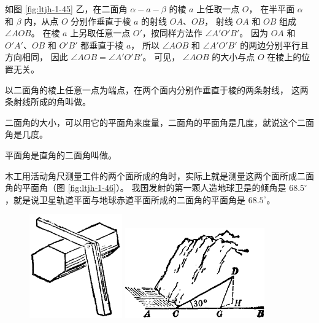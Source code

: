 如图 \ref{fig:ltjh-1-45} 乙，在二面角 $\alpha{-}a{-}\beta$ 的棱 $a$ 上任取一点 $O$，
在半平面 $\alpha$ 和 $\beta$ 内，从点 $O$ 分别作垂直于棱 $a$ 的射线 $OA$、$OB$，
射线 $OA$ 和 $OB$ 组成 $\angle AOB$。
在棱 $a$ 上另取任意一点 $O'$，按同样方法作 $\angle A'O'B'$。
因为 $OA$ 和 $O'A'$、$OB$ 和 $O'B'$ 都垂直于棱 $a$，
所以 $\angle AOB$ 和 $\angle A'O'B'$ 的两边分别平行且方向相同，
因此 $\angle AOB = \angle A'O'B'$。
可见， $\angle AOB$ 的大小与点 $O$ 在棱上的位置无关。

以二面角的棱上任意一点为端点，在两个面内分别作垂直于棱的两条射线，
这两条射线所成的角叫做。

二面角的大小，可以用它的平面角来度量，二面角的平面角是几度，就说这个二面角是几度。

平面角是直角的二面角叫做。

木工用活动角尺测量工件的两个面所成的角时，实际上就是测量这两个面所成二面角的平面角（图 \ref{fig:ltjh-1-46}）。
我国发射的第一颗人造地球卫是的倾角是 $68.5^\circ$，就是说卫星轨道平面与地球赤道平面所成的二面角的平面角是 $68.5^\circ$。

\begin{figure}[htbp]
    \centering
    \begin{minipage}[b]{7cm}
        \centering
        \includegraphics[width=4cm]{../pic/ltjh-ch1-46.png}
        \caption{}\label{fig:ltjh-1-46}
    \end{minipage}
    \qquad
    \begin{minipage}[b]{7cm}
        \centering
        \includegraphics[width=6cm]{../pic/ltjh-ch1-47.png}
        \caption{}\label{fig:ltjh-1-47}
    \end{minipage}
\end{figure}

